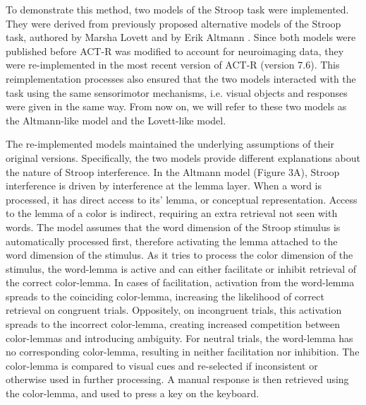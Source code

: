 \documentclass[10pt,letterpaper]{article}
\begin{document}
To demonstrate this method, two models of the Stroop task were implemented. They were derived from previously proposed alternative models of the Stroop task, authored by Marsha Lovett \cite{Lovett2005} and by Erik Altmann \cite{VanMaanen2009}. Since both models were published before ACT-R was modified to account for neuroimaging data, they were re-implemented in the most recent version of ACT-R (version 7.6). This reimplementation processes also ensured that the two models interacted with the task using the same sensorimotor mechanisms, i.e. visual objects and responses were given in the same way. From now on, we will refer to these two models as the Altmann-like model and the Lovett-like model. 

The re-implemented models maintained the underlying assumptions of their original versions. Specifically, the two models provide different explanations about the nature of Stroop interference. In the Altmann model (Figure 3A), Stroop interference is driven by interference at the lemma layer. When a word is processed, it has direct access to its' lemma, or conceptual representation. Access to the lemma of a color is indirect, requiring an extra retrieval not seen with words. The model assumes that the word dimension of the Stroop stimulus is automatically processed first, therefore activating the lemma attached to the word dimension of the stimulus. As it tries to process the color dimension of the stimulus, the word-lemma is active and can either facilitate or inhibit retrieval of the correct color-lemma. In cases of facilitation, activation from the word-lemma spreads to the coinciding color-lemma, increasing the likelihood of correct retrieval on congruent trials. Oppositely, on incongruent trials, this activation spreads to the incorrect color-lemma, creating increased competition between color-lemmas and introducing ambiguity. For neutral trials, the word-lemma has no corresponding color-lemma, resulting in neither facilitation nor inhibition. The color-lemma is compared to visual cues and re-selected if inconsistent or otherwise used in further processing. A manual response is then retrieved using the color-lemma, and used to press a key on the keyboard. 
\end{document}
